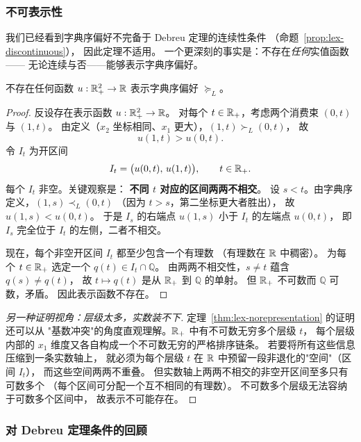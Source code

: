 \subsubsection{不可表示性}
\label{subsec:lex-nonrep}

我们已经看到字典序偏好不完备于 Debreu 定理的连续性条件
（命题~\ref{prop:lex-discontinuous}），
因此定理不适用。
一个更深刻的事实是：不存在\emph{任何}实值函数——
无论连续与否——能够表示字典序偏好。

\begin{theorem}[字典序偏好不可表示]\label{thm:lex-norepresentation}
不存在任何函数 $u:\mathbb{R}^2_+\to\mathbb{R}$ 表示字典序偏好 $\succeq_L$。
\end{theorem}

\begin{proof}
反设存在表示函数 $u:\mathbb{R}^2_+\to\mathbb{R}$。
对每个 $t\in\mathbb{R}_+$，考虑两个消费束 $(0,t)$ 与 $(1,t)$。
由定义（$x_2$ 坐标相同、$x_1$ 更大），$(1,t)\succ_L(0,t)$，
故
\[
  u(1,t)>u(0,t).
\]
令 $I_t$ 为开区间
\[
  I_t=\bigl(u(0,t),\, u(1,t)\bigr),\qquad t\in\mathbb{R}_+ .
\]
每个 $I_t$ 非空。关键观察是：
\textbf{不同 $t$ 对应的区间两两不相交}。
设 $s<t$。由字典序定义，$(1,s)\prec_L(0,t)$
（因为 $t>s$，第二坐标更大者胜出），
故 $u(1,s)<u(0,t)$。
于是 $I_s$ 的右端点 $u(1,s)$ 小于 $I_t$ 的左端点 $u(0,t)$，
即 $I_s$ 完全位于 $I_t$ 的左侧，二者不相交。

现在，每个非空开区间 $I_t$ 都至少包含一个有理数
（有理数在 $\mathbb{R}$ 中稠密）。
为每个 $t\in\mathbb{R}_+$ 选定一个 $q(t)\in I_t\cap\mathbb{Q}$。
由两两不相交性，$s\neq t$ 蕴含 $q(s)\neq q(t)$，
故 $t\mapsto q(t)$ 是从 $\mathbb{R}_+$ 到 $\mathbb{Q}$ 的单射。
但 $\mathbb{R}_+$ 不可数而 $\mathbb{Q}$ 可数，矛盾。
因此表示函数不存在。
\end{proof}

\begin{proof}[另一种证明视角：层级太多，实数装不下]
定理~\ref{thm:lex-norepresentation} 的证明还可以从
"基数冲突"的角度直观理解。$\mathbb{R}_+$ 中有不可数无穷多个层级 $t$，
每个层级内部的 $x_1$ 维度又各自构成一个不可数无穷的严格排序链条。
若要将所有这些信息压缩到一条实数轴上，
就必须为每个层级 $t$ 在 $\mathbb{R}$ 中预留一段非退化的"空间"（区间 $I_t$），
而这些空间两两不重叠。
但实数轴上两两不相交的非空开区间至多只有可数多个
（每个区间可分配一个互不相同的有理数）。
不可数多个层级无法容纳于可数多个区间中，
故表示不可能存在。
\end{proof}

\subsubsection{对 Debreu 定理条件的回顾}
\label{subsec:lex-lesson}

